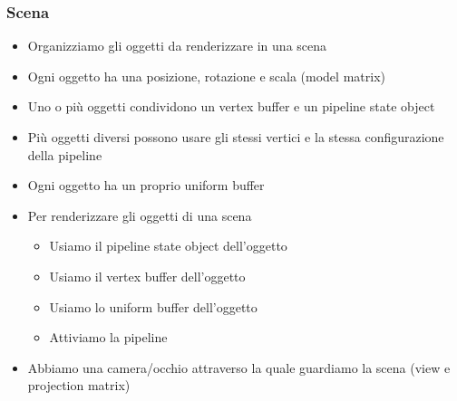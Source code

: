 \begin{frame}
\frametitle{Scena}
\begin{itemize}
\item Organizziamo gli oggetti da renderizzare in una scena
\item Ogni oggetto ha una posizione, rotazione e scala (model matrix)
\item Uno o più oggetti condividono un vertex buffer e un pipeline state object
\item Più oggetti diversi possono usare gli stessi vertici e la stessa configurazione della pipeline
\item Ogni oggetto ha un proprio uniform buffer
\item Per renderizzare gli oggetti di una scena
\begin{itemize}
\item Usiamo il pipeline state object dell'oggetto
\item Usiamo il vertex buffer dell'oggetto
\item Usiamo lo uniform buffer dell'oggetto
\item Attiviamo la pipeline
\end{itemize}
\item Abbiamo una camera/occhio attraverso la quale guardiamo la scena (view e projection matrix)
\end{itemize}
\end{frame}
